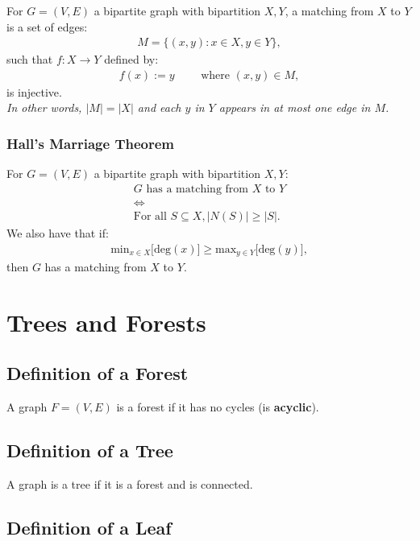 \documentclass[a4paper, 12pt, twoside]{article}
\begin{document}
For $G = (V, E)$ a bipartite graph with bipartition $X, Y$,
a matching from $X$ to $Y$ is a set of edges: \begin{gather*}
  M = \{(x, y) : x \in X, y \in Y\},
\end{gather*} such that $f : X \to Y$ defined by: \begin{gather*}
  f(x) := y \qquad \text{ where } (x, y) \in M,
\end{gather*} is injective.
\\[\baselineskip]
\textit{In other words, $|M| = |X|$ and each $y$ in $Y$ appears 
in at most one edge in $M$.}

\subsubsection{Hall's Marriage Theorem}

For $G = (V, E)$ a bipartite graph with bipartition $X, Y$: \begin{gather*}
  G \text{ has a matching from } X \text{ to } Y \\
  \Longleftrightarrow \\
  \text{For all } S \subseteq X, |N(S)| \geq |S|.
\end{gather*} We also have that if: \begin{gather*}
  \text{min}_{x \in X}\big[\text{deg}(x)\big] \geq
  \text{max}_{y \in Y}\big[\text{deg}(y)\big],
\end{gather*} then $G$ has a matching from $X$ to $Y$.

\vfill

\section{Trees and Forests}

\subsection{Definition of a Forest}

A graph $F = (V, E)$ is a forest if it has no cycles
(is \textbf{acyclic}).

\subsection{Definition of a Tree}

A graph is a tree if it is a forest and is connected.

\subsection{Definition of a Leaf}
\end{document}

